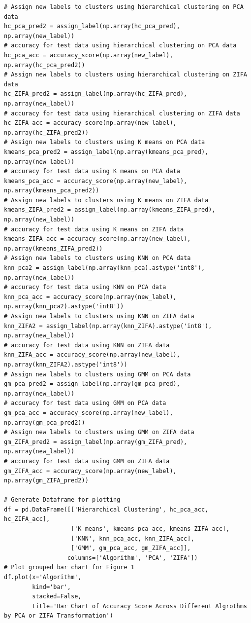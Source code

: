 \documentclass[12pt]{article}
\theoremstyle{definition}
\begin{document}
\begin{lstlisting}
# Assign new labels to clusters using hierarchical clustering on PCA data
hc_pca_pred2 = assign_label(np.array(hc_pca_pred), np.array(new_label))
# accuracy for test data using hierarchical clustering on PCA data
hc_pca_acc = accuracy_score(np.array(new_label), np.array(hc_pca_pred2))
# Assign new labels to clusters using hierarchical clustering on ZIFA data
hc_ZIFA_pred2 = assign_label(np.array(hc_ZIFA_pred), np.array(new_label))
# accuracy for test data using hierarchical clustering on ZIFA data
hc_ZIFA_acc = accuracy_score(np.array(new_label), np.array(hc_ZIFA_pred2))
# Assign new labels to clusters using K means on PCA data
kmeans_pca_pred2 = assign_label(np.array(kmeans_pca_pred), np.array(new_label))
# accuracy for test data using K means on PCA data
kmeans_pca_acc = accuracy_score(np.array(new_label), np.array(kmeans_pca_pred2))
# Assign new labels to clusters using K means on ZIFA data
kmeans_ZIFA_pred2 = assign_label(np.array(kmeans_ZIFA_pred), np.array(new_label))
# accuracy for test data using K means on ZIFA data
kmeans_ZIFA_acc = accuracy_score(np.array(new_label), np.array(kmeans_ZIFA_pred2))
# Assign new labels to clusters using KNN on PCA data
knn_pca2 = assign_label(np.array(knn_pca).astype('int8'), np.array(new_label))
# accuracy for test data using KNN on PCA data
knn_pca_acc = accuracy_score(np.array(new_label), np.array(knn_pca2).astype('int8'))
# Assign new labels to clusters using KNN on ZIFA data
knn_ZIFA2 = assign_label(np.array(knn_ZIFA).astype('int8'), np.array(new_label))
# accuracy for test data using KNN on ZIFA data
knn_ZIFA_acc = accuracy_score(np.array(new_label), np.array(knn_ZIFA2).astype('int8'))
# Assign new labels to clusters using GMM on PCA data
gm_pca_pred2 = assign_label(np.array(gm_pca_pred), np.array(new_label))
# accuracy for test data using GMM on PCA data
gm_pca_acc = accuracy_score(np.array(new_label), np.array(gm_pca_pred2))
# Assign new labels to clusters using GMM on ZIFA data
gm_ZIFA_pred2 = assign_label(np.array(gm_ZIFA_pred), np.array(new_label))
# accuracy for test data using GMM on ZIFA data
gm_ZIFA_acc = accuracy_score(np.array(new_label), np.array(gm_ZIFA_pred2))

# Generate Dataframe for plotting
df = pd.DataFrame([['Hierarchical Clustering', hc_pca_acc, hc_ZIFA_acc], 
                   ['K means', kmeans_pca_acc, kmeans_ZIFA_acc],
                   ['KNN', knn_pca_acc, knn_ZIFA_acc], 
                   ['GMM', gm_pca_acc, gm_ZIFA_acc]],
                  columns=['Algorithm', 'PCA', 'ZIFA'])
# Plot grouped bar chart for Figure 1
df.plot(x='Algorithm',
        kind='bar',
        stacked=False,
        title='Bar Chart of Accuracy Score Across Different Algrothms by PCA or ZIFA Transformation')


\end{lstlisting}
\end{document}
